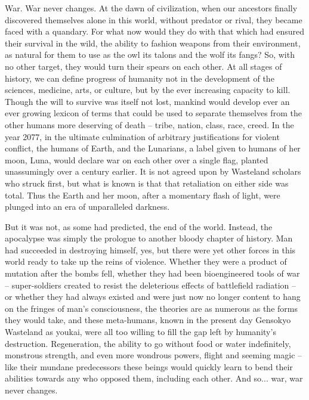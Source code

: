 \documentclass[a4paper,12pt]{article}
\begin{document}
War. War never changes. At the dawn of civilization, when our ancestors finally discovered themselves alone in this world, without predator or rival, they became faced with a quandary. For what now would they do with that which had ensured their survival in the wild, the ability to fashion weapons from their environment, as natural for them to use as the owl its talons and the wolf its fangs? So, with no other target, they would turn their spears on each other. At all stages of history, we can define progress of humanity not in the development of the sciences, medicine, arts, or culture, but by the ever increasing capacity to kill. Though the will to survive was itself not lost, mankind would develop ever an ever growing lexicon of terms that could be used to separate themselves from the other humans more deserving of death -- tribe, nation, class, race, creed. In the year 2077, in the ultimate culmination of arbitrary justifications for violent conflict, the humans of Earth, and the Lunarians, a label given to humans of her moon, Luna, would declare war on each other over a single flag, planted unassumingly over a century earlier. It is not agreed upon by Wasteland scholars who struck first, but what is known is that that retaliation on either side was total. Thus the Earth and her moon, after a momentary flash of light, were plunged into an era of unparalleled darkness.

But it was not, as some had predicted, the end of the world. Instead, the apocalypse was simply the prologue to another bloody chapter of history. Man had succeeded in destroying himself, yes, but there were yet other forces in this world ready to take up the reins of violence. Whether they were a product of mutation after the bombs fell, whether they had been bioengineered tools of war -- super-soldiers created to resist the deleterious effects of battlefield radiation -- or whether they had always existed and were just now no longer content to hang on the fringes of man's consciousness, the theories are as numerous as the forms they would take, and these meta-humans, known in the present day Gensokyo Wasteland as youkai, were all too willing to fill the gap left by humanity's destruction. Regeneration, the ability to go without food or water indefinitely, monstrous strength, and even more wondrous powers, flight and seeming magic -- like their mundane predecessors these beings would quickly learn to bend their abilities towards any who opposed them, including each other. And so... war, war never changes.
\end{document}
